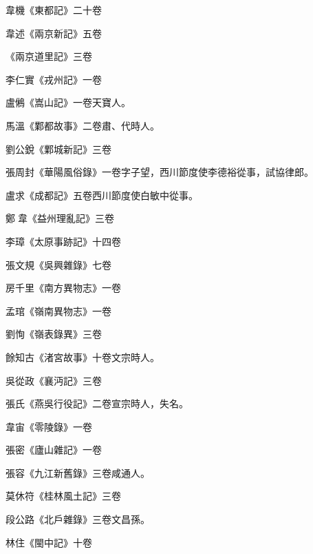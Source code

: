 \begin{pinyinscope}
 韋機《東都記》二十卷



 韋述《兩京新記》五卷



 《兩京道里記》三卷



 李仁實《戎州記》一卷



 盧鵂《嵩山記》一卷天寶人。



 馬溫《鄴都故事》二卷肅、代時人。



 劉公銳《鄴城新記》三卷



 張周封《華陽風俗錄》一卷字子望，西川節度使李德裕從事，試協律郎。



 盧求《成都記》五卷西川節度使白敏中從事。



 鄭韋《益州理亂記》三卷



 李璋《太原事跡記》十四卷



 張文規《吳興雜錄》七卷



 房千里《南方異物志》一卷



 孟琯《嶺南異物志》一卷



 劉恂《嶺表錄異》三卷



 餘知古《渚宮故事》十卷文宗時人。



 吳從政《襄沔記》三卷



 張氏《燕吳行役記》二卷宣宗時人，失名。



 韋宙《零陵錄》一卷



 張密《廬山雜記》一卷



 張容《九江新舊錄》三卷咸通人。



 莫休符《桂林風土記》三卷



 段公路《北戶雜錄》三卷文昌孫。



 林住《閩中記》十卷




\end{pinyinscope}
